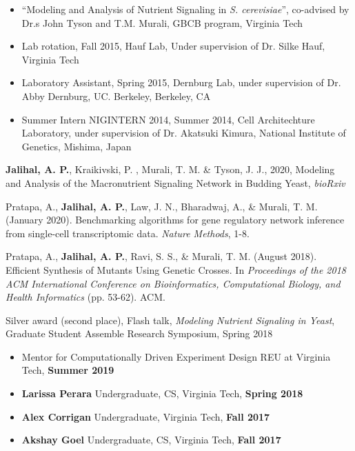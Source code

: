\documentclass[10pt,a4paper,ragged2e]{altacv}
\begin{document}
\begin{itemize}
\item ``Modeling and Analysis of Nutrient Signaling in \textit{S. cerevisiae}'', co-advised by Dr.s John Tyson and T.M. Murali, GBCB program, Virginia Tech
  \item Lab rotation, Fall 2015, Hauf Lab, Under supervision of Dr. Silke Hauf, Virginia Tech
  \item Laboratory Assistant, Spring 2015, Dernburg Lab, under supervision of Dr. Abby Dernburg, UC. Berkeley, Berkeley, CA
  \item Summer Intern  NIGINTERN 2014, Summer 2014, Cell Architechture Laboratory, under supervision of Dr. Akatsuki Kimura, National Institute of Genetics, Mishima, Japan
\end{itemize}

\begin{etaremune}
\item \textbf{Jalihal, A. P.}, Kraikivski, P. , Murali, T. M. \& Tyson, J. J., 2020, Modeling and Analysis of the Macronutrient Signaling Network in Budding Yeast, \textit{bioRxiv}
\item Pratapa, A., \textbf{Jalihal, A. P.}, Law, J. N., Bharadwaj, A., \& Murali, T. M. (January 2020). Benchmarking algorithms for gene regulatory network inference from single-cell transcriptomic data. \textit{Nature Methods}, 1-8.
\item Pratapa, A., \textbf{Jalihal, A. P.}, Ravi, S. S., \& Murali, T. M. (August 2018). Efficient Synthesis of Mutants Using Genetic Crosses. In \textit{Proceedings of the 2018 ACM International Conference on Bioinformatics, Computational Biology, and Health Informatics} (pp. 53-62). ACM.
\end{etaremune}


Silver award (second place), Flash talk, \textit{Modeling Nutrient Signaling in Yeast}, Graduate Student Assemble Research Symposium, Spring 2018
\clearpage

\begin{itemize}
  \item Mentor for Computationally Driven Experiment Design REU at Virginia Tech, \textbf{Summer 2019}
  \item \textbf{Larissa Perara} Undergraduate, CS, Virginia Tech,   \textbf{Spring 2018}
  \item \textbf{Alex Corrigan} Undergraduate, Virginia Tech,  \textbf{Fall 2017}    
  \item \textbf{Akshay Goel} Undergraduate, CS, Virginia Tech,  \textbf{Fall 2017}
\end{itemize}
\end{document}
